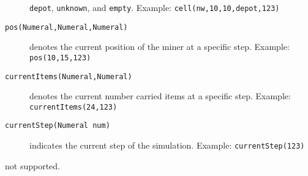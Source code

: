 \documentclass[a4]{article}
\begin{document}
\begin{description}
\texttt{depot}, \texttt{unknown}, and \texttt{empty}.
Example: \texttt{cell(nw,10,10,depot,123)}
\item[\texttt{pos(Numeral,Numeral,Numeral)}] denotes the current position of the miner at a specific step. Example: \texttt{pos(10,15,123)}
\item[\texttt{currentItems(Numeral,Numeral)}] denotes the current number carried items at a specific step. Example: \texttt{currentItems(24,123)}
\item[\texttt{currentStep(Numeral num)}] indicates the current step of the simulation.
Example: \texttt{currentStep(123)}
\end{description}

 not supported.
\end{document}
